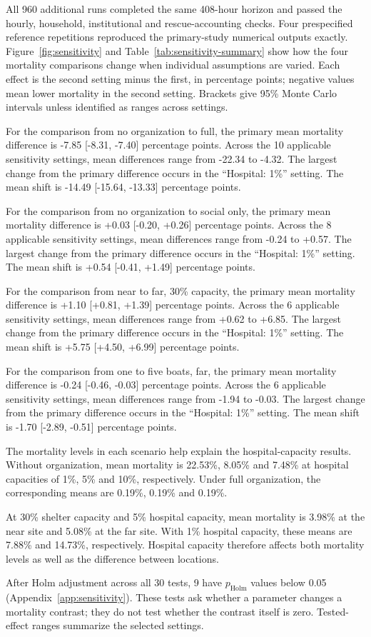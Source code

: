 All 960 additional runs completed the same 408-hour horizon and passed the hourly, household, institutional and rescue-accounting checks. Four prespecified reference repetitions reproduced the primary-study numerical outputs exactly. Figure~\ref{fig:sensitivity} and Table~\ref{tab:sensitivity-summary} show how the four mortality comparisons change when individual assumptions are varied. Each effect is the second setting minus the first, in percentage points; negative values mean lower mortality in the second setting. Brackets give 95\% Monte Carlo intervals unless identified as ranges across settings.

For the comparison from no organization to full, the primary mean mortality difference is -7.85 [-8.31, -7.40] percentage points. Across the 10 applicable sensitivity settings, mean differences range from -22.34 to -4.32. The largest change from the primary difference occurs in the ``Hospital: 1\%'' setting. The mean shift is -14.49 [-15.64, -13.33] percentage points.

For the comparison from no organization to social only, the primary mean mortality difference is +0.03 [-0.20, +0.26] percentage points. Across the 8 applicable sensitivity settings, mean differences range from -0.24 to +0.57. The largest change from the primary difference occurs in the ``Hospital: 1\%'' setting. The mean shift is +0.54 [-0.41, +1.49] percentage points.

For the comparison from near to far, 30\% capacity, the primary mean mortality difference is +1.10 [+0.81, +1.39] percentage points. Across the 6 applicable sensitivity settings, mean differences range from +0.62 to +6.85. The largest change from the primary difference occurs in the ``Hospital: 1\%'' setting. The mean shift is +5.75 [+4.50, +6.99] percentage points.

For the comparison from one to five boats, far, the primary mean mortality difference is -0.24 [-0.46, -0.03] percentage points. Across the 6 applicable sensitivity settings, mean differences range from -1.94 to -0.03. The largest change from the primary difference occurs in the ``Hospital: 1\%'' setting. The mean shift is -1.70 [-2.89, -0.51] percentage points.

The mortality levels in each scenario help explain the hospital-capacity results. Without organization, mean mortality is 22.53\%, 8.05\% and 7.48\% at hospital capacities of 1\%, 5\% and 10\%, respectively. Under full organization, the corresponding means are 0.19\%, 0.19\% and 0.19\%.

At 30\% shelter capacity and 5\% hospital capacity, mean mortality is 3.98\% at the near site and 5.08\% at the far site. With 1\% hospital capacity, these means are 7.88\% and 14.73\%, respectively. Hospital capacity therefore affects both mortality levels as well as the difference between locations.

After Holm adjustment across all 30 tests, 9 have $p_{\mathrm{Holm}}$ values below 0.05 (Appendix~\ref{app:sensitivity}). These tests ask whether a parameter changes a mortality contrast; they do not test whether the contrast itself is zero. Tested-effect ranges summarize the selected settings.
